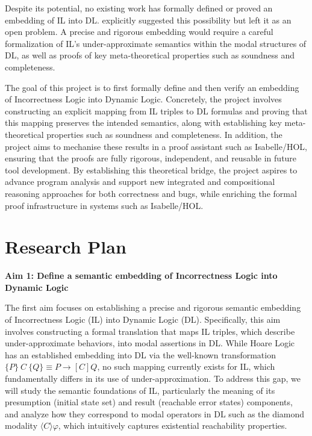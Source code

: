 Despite its potential, no existing work has formally defined or proved an embedding of IL into DL. \cite{ohearnincorrectness2020} explicitly suggested this possibility but left it as an open problem. A precise and rigorous embedding would require a careful formalization of IL’s under-approximate semantics within the modal structures of DL, as well as proofs of key meta-theoretical properties such as soundness and completeness.

The goal of this project is to first formally define and then verify an embedding of Incorrectness Logic into Dynamic Logic. Concretely, the project involves constructing an explicit mapping from IL triples to DL formulas and proving that this mapping preserves the intended semantics, along with establishing key meta-theoretical properties such as soundness and completeness. In addition, the project aims to mechanise these results in a proof assistant such as Isabelle/HOL, ensuring that the proofs are fully rigorous, independent, and reusable in future tool development. By establishing this theoretical bridge, the project aspires to advance program analysis and support new integrated and compositional reasoning approaches for both correctness and bugs, while enriching the formal proof infrastructure in systems such as Isabelle/HOL.


\section*{Research Plan}
\textbf{Aim 1: Define a semantic embedding of Incorrectness Logic into Dynamic Logic}

The first aim focuses on establishing a precise and rigorous semantic embedding of Incorrectness Logic (IL) into Dynamic Logic (DL). Specifically, this aim involves constructing a formal translation that maps IL triples, which describe under-approximate behaviors, into modal assertions in DL. While Hoare Logic has an established embedding into DL via the well-known transformation $\{P\}~C~\{Q\} \equiv P \rightarrow [C]Q$, no such mapping currently exists for IL, which fundamentally differs in its use of under-approximation. To address this gap, we will study the semantic foundations of IL, particularly the meaning of its presumption (initial state set) and result (reachable error states) components, and analyze how they correspond to modal operators in DL such as the diamond modality $\langle C \rangle \varphi$, which intuitively captures existential reachability properties.


